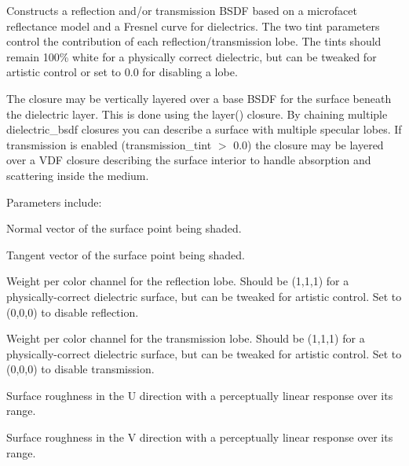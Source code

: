 \documentclass[11pt,letterpaper]{book}
\begin{document}
Constructs a reflection and/or transmission BSDF based on a microfacet
reflectance model and a Fresnel curve for dielectrics. The two tint parameters
control the contribution of each reflection/transmission lobe. The tints
should remain 100\% white for a physically correct dielectric, but can be
tweaked for artistic control or set to 0.0 for disabling a lobe.

The closure may be vertically layered over a base BSDF for the surface beneath
the dielectric layer. This is done using the {\cf layer()} closure. By
chaining multiple {\cf dielectric_bsdf} closures you can describe a surface
with multiple specular lobes. If transmission is enabled (transmission_tint
$>$ 0.0) the closure may be layered over a VDF closure describing the surface
interior to handle absorption and scattering inside the medium.

\noindent Parameters include:

  \vspace{12pt}
  Normal vector of the surface point being shaded.
  \apiend
  \vspace{-16pt}
  
  \vspace{12pt}
  Tangent vector of the surface point being shaded.
  \apiend
  \vspace{-16pt}
  
  \vspace{12pt}
  Weight per color channel for the reflection lobe. Should be (1,1,1) for a physically-correct dielectric surface, but can be tweaked for artistic control. Set to (0,0,0) to disable reflection.
  \apiend
  \vspace{-16pt}
  
  \vspace{12pt}
  Weight per color channel for the transmission lobe. Should be (1,1,1) for a physically-correct dielectric surface, but can be tweaked for artistic control. Set to (0,0,0) to disable transmission.
  \apiend
  \vspace{-16pt}
  
  \vspace{12pt}
  Surface roughness in the U direction with a perceptually linear response over its range.
  \apiend
  \vspace{-16pt}
  
  \vspace{12pt}
  Surface roughness in the V direction with a perceptually linear response
  over its range.
  \apiend
  \vspace{-16pt}
  
\end{document}
